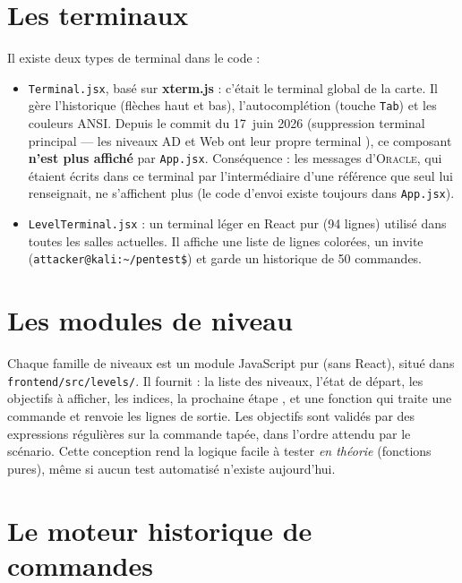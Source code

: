 \documentclass[11pt,a4paper]{report}
\newcommand{\file}[1]{\texttt{\nolinkurl{#1}}}
\begin{document}
\section{Les terminaux}
\label{sec:terminaux}

Il existe deux types de terminal dans le code :

\begin{itemize}
  \item \texttt{Terminal.jsx}, bas\'e sur \textbf{xterm.js} : c'\'etait le terminal global
        de la carte. Il g\`ere l'historique (fl\`eches haut et bas), l'autocompl\'etion
        (touche \texttt{Tab}) et les couleurs ANSI. Depuis le commit du 17~juin 2026
        (\og suppression terminal principal --- les niveaux AD et Web ont leur propre
        terminal \fg), ce composant \textbf{n'est plus affich\'e} par \file{App.jsx}.
        Cons\'equence : les messages d'\textsc{Oracle}, qui \'etaient \'ecrits dans ce
        terminal par l'interm\'ediaire d'une r\'ef\'erence que seul lui renseignait, ne
        s'affichent plus (le code d'envoi existe toujours dans \file{App.jsx}).
  \item \texttt{LevelTerminal.jsx} : un terminal l\'eger en React pur (94 lignes) utilis\'e
        dans toutes les salles actuelles. Il affiche une liste de lignes color\'ees,
        un invite (\texttt{attacker@kali:\~{}/pentest\$}) et garde un historique de 50
        commandes.
\end{itemize}

\section{Les modules de niveau}

Chaque famille de niveaux est un module JavaScript pur (sans React), situ\'e dans
\file{frontend/src/levels/}. Il fournit : la liste des niveaux, l'\'etat de d\'epart,
les objectifs \`a afficher, les indices, la \og prochaine \'etape \fg, et une fonction qui
traite une commande et renvoie les lignes de sortie. Les objectifs sont valid\'es par des
expressions r\'eguli\`eres sur la commande tap\'ee, dans l'ordre attendu par le sc\'enario.
Cette conception rend la logique facile \`a tester \emph{en th\'eorie} (fonctions pures),
m\^eme si aucun test automatis\'e n'existe aujourd'hui.

\section{Le moteur historique de commandes}
\end{document}
